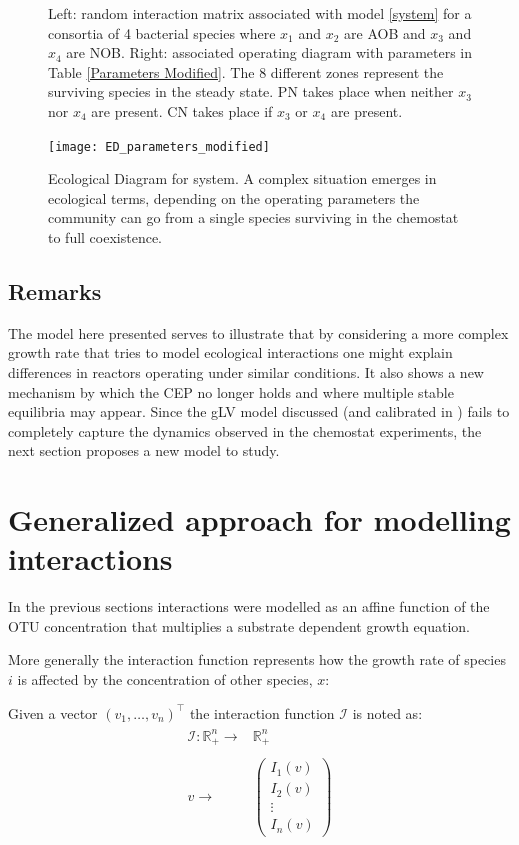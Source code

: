 \documentclass[3p,times]{elsarticle}
\newcommand{\R}{\mathbb{R}}
\newcommand{\I}{\mathcal{I}}
\begin{document}
\begin{figure}[ht]
\begin{subfigure}[b]{0.45\textwidth}
	\end{subfigure}
	\caption{Left: random interaction matrix associated with model \eqref{system} for a consortia of 4 bacterial species where $x_1$ and $x_2$ are AOB and $x_3$ and $x_4$ are NOB. Right: associated operating diagram with parameters in Table \ref{Parameters Modified}. The 8 different zones represent the surviving species in the steady state. PN takes place when neither $x_3$ nor $x_4$ are present. CN takes place if $x_3$ or $x_4$ are present.}
	\label{OD modified}
\end{figure}

\begin{figure}
		\texttt{[image: ED\_parameters\_modified]}
		\caption{Ecological Diagram for system. A complex situation emerges in ecological terms, depending on the operating parameters the community can go from a single species surviving in the chemostat to full coexistence.}
		\label{ED_modified}
\end{figure}
\clearpage

\subsection{Remarks}

The model here presented serves to illustrate that by considering a more complex growth rate that tries to model ecological interactions one might explain differences in reactors operating under similar conditions. It also shows a new mechanism by which the CEP no longer holds and where multiple stable equilibria may appear. Since the gLV model discussed (and calibrated in \cite{Dumont2016}) fails to completely capture the dynamics observed in the chemostat experiments, the next section proposes a new model to study.

\section{Generalized approach for modelling interactions}
In the previous sections interactions were modelled as an affine function of the OTU concentration that multiplies a substrate dependent growth equation. 

More generally the interaction function represents how the growth rate of species $i$ is affected by the concentration of other species, $x$:

Given a vector $(v_1,\dots,v_n)^\top$ the interaction function $\I$ is noted as:
\begin{align}
\begin{array}{rc}
\I: \R_+^n \rightarrow & \R_+^n\\
& \\
v \rightarrow & \begin{pmatrix}
I_1(v) \\
I_2(v) \\ 
\vdots  \\
I_n(v)
\end{pmatrix}
\end{array}
\end{align}
\end{document}
